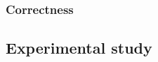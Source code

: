 \subsubsection{Correctness}
\label{sec:correctness}

\subsection{Experimental study}
\label{sec:experiments}